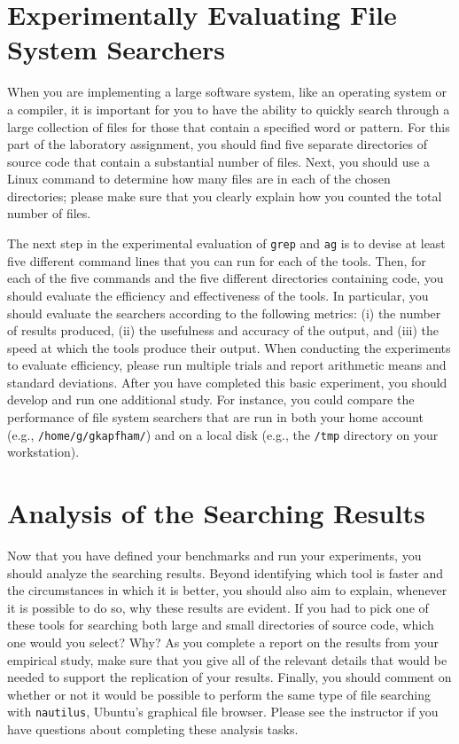 \section*{Experimentally Evaluating File System Searchers}

When you are implementing a large software system, like an operating system or a compiler, it is important for you to have
the ability to quickly search through a large collection of files for those that contain a specified word or pattern.
For this part of the laboratory assignment, you should find five separate directories of source code that contain a
substantial number of files. Next, you should use a Linux command to determine how many files are in each of the chosen
directories; please make sure that you clearly explain how you counted the total number of files.

The next step in the experimental evaluation of {\tt grep} and {\tt ag} is to devise at least five different command
lines that you can run for each of the tools. Then, for each of the five commands and the five different directories
containing code, you should evaluate the efficiency and effectiveness of the tools. In particular, you should evaluate
the searchers according to the following metrics: (i) the number of results produced, (ii) the usefulness and accuracy
of the output, and (iii) the speed at which the tools produce their output. When conducting the experiments to evaluate
efficiency, please run multiple trials and report arithmetic means and standard deviations. After you have completed
this basic experiment, you should develop and run one additional study. For instance, you could compare the performance
of file system searchers that are run in both your home account (e.g., {\tt /home/g/gkapfham/}) and on a local disk
(e.g., the {\tt /tmp} directory on your workstation).

\section*{Analysis of the Searching Results}

Now that you have defined your benchmarks and run your experiments, you should analyze the searching results. Beyond
identifying which tool is faster and the circumstances in which it is better, you should also aim to explain, whenever
it is possible to do so, why these results are evident. If you had to pick one of these tools for searching both large
and small directories of source code, which one would you select? Why? As you complete a report on the results from your
empirical study, make sure that you give all of the relevant details that would be needed to support the replication of
your results. Finally, you should comment on whether or not it would be possible to perform the same type of file
searching with {\tt nautilus}, Ubuntu's graphical file browser. Please see the instructor if you have questions about
completing these analysis tasks.

